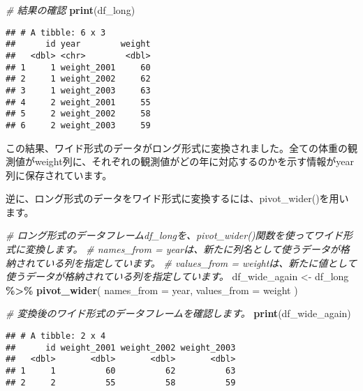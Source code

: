 \documentclass[
]{article}
\newenvironment{Shaded}{\begin{snugshade}}{\end{snugshade}}
\newcommand{\AttributeTok}[1]{\textcolor[rgb]{0.13,0.29,0.53}{#1}}
\newcommand{\CommentTok}[1]{\textcolor[rgb]{0.56,0.35,0.01}{\textit{#1}}}
\newcommand{\FunctionTok}[1]{\textcolor[rgb]{0.13,0.29,0.53}{\textbf{#1}}}
\newcommand{\NormalTok}[1]{#1}
\newcommand{\OtherTok}[1]{\textcolor[rgb]{0.56,0.35,0.01}{#1}}
\newcommand{\SpecialCharTok}[1]{\textcolor[rgb]{0.81,0.36,0.00}{\textbf{#1}}}
\begin{document}
\begin{Shaded}
\begin{Highlighting}[]
\CommentTok{\# 結果の確認}
\FunctionTok{print}\NormalTok{(df\_long)}
\end{Highlighting}
\end{Shaded}

\begin{verbatim}
## # A tibble: 6 x 3
##      id year        weight
##   <dbl> <chr>        <dbl>
## 1     1 weight_2001     60
## 2     1 weight_2002     62
## 3     1 weight_2003     63
## 4     2 weight_2001     55
## 5     2 weight_2002     58
## 6     2 weight_2003     59
\end{verbatim}

この結果、ワイド形式のデータがロング形式に変換されました。全ての体重の観測値がweight列に、それぞれの観測値がどの年に対応するのかを示す情報がyear列に保存されています。

逆に、ロング形式のデータをワイド形式に変換するには、pivot\_wider()を用います。

\begin{Shaded}
\begin{Highlighting}[]
\CommentTok{\# ロング形式のデータフレームdf\_longを、pivot\_wider()関数を使ってワイド形式に変換します。}
\CommentTok{\# names\_from = yearは、新たに列名として使うデータが格納されている列を指定しています。}
\CommentTok{\# values\_from = weightは、新たに値として使うデータが格納されている列を指定しています。}
\NormalTok{df\_wide\_again }\OtherTok{\textless{}{-}}\NormalTok{ df\_long }\SpecialCharTok{\%\textgreater{}\%}
  \FunctionTok{pivot\_wider}\NormalTok{(}
    \AttributeTok{names\_from =}\NormalTok{ year,}
    \AttributeTok{values\_from =}\NormalTok{ weight}
\NormalTok{  )}
\end{Highlighting}
\end{Shaded}

\begin{Shaded}
\begin{Highlighting}[]
\CommentTok{\# 変換後のワイド形式のデータフレームを確認します。}
\FunctionTok{print}\NormalTok{(df\_wide\_again)}
\end{Highlighting}
\end{Shaded}

\begin{verbatim}
## # A tibble: 2 x 4
##      id weight_2001 weight_2002 weight_2003
##   <dbl>       <dbl>       <dbl>       <dbl>
## 1     1          60          62          63
## 2     2          55          58          59
\end{verbatim}
\end{document}
